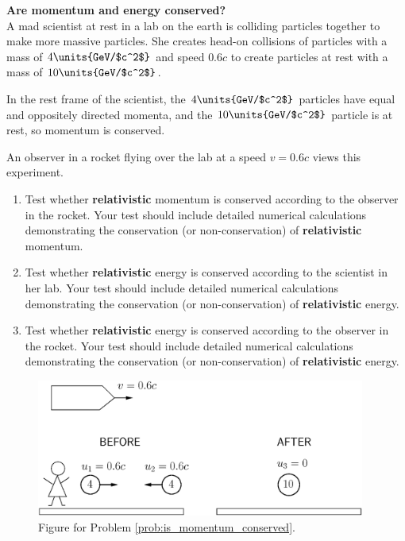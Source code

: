 \begin{problem}{\bf Are momentum and energy conserved?}\\
A mad scientist at rest in a lab on the earth is colliding particles together
to make more massive particles.  She creates head-on collisions of 
particles with a mass of $4\units{GeV/$c^2$}$ and speed $0.6c$ to create 
particles at rest with a mass of $10\units{GeV/$c^2$}$.

In the rest frame of the scientist, the  $4\units{GeV/$c^2$}$ particles
have equal and oppositely directed momenta, and the $10\units{GeV/$c^2$}$
particle is at rest, so momentum is conserved.

An observer in a rocket flying over the lab at a speed $v=0.6c$ views this 
experiment.  

\begin{enumerate}
\item Test whether {\bf relativistic} momentum is conserved 
according to the observer in the rocket.  Your test should include 
detailed numerical calculations  demonstrating the conservation 
(or non-conservation) of {\bf relativistic} momentum.
\item  Test whether {\bf relativistic} energy is conserved 
according to the scientist in her lab.  Your test should include 
detailed numerical calculations demonstrating the conservation 
(or non-conservation) of {\bf relativistic} energy.
\item  Test whether {\bf relativistic} energy is conserved 
according to the observer in the rocket.  Your test should include 
detailed numerical calculations demonstrating the conservation 
(or non-conservation) of {\bf relativistic} energy.
\end{enumerate}
 
 \begin{figure}[h]
    \begin{center}
    \includegraphics[width=4.25in]{relativistic_momentum_and_energy/atomsmasher.eps}
    \end{center}
    \caption{Figure for Problem \ref{prob:is_momentum_conserved}.}  
    \label{fig:is_momentum_conserved}
  \end{figure}

\label{prob:is_momentum_conserved}
\end{problem}
